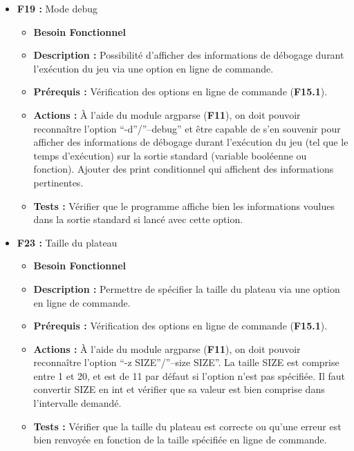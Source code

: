 \documentclass{article}
\begin{document}
\begin{itemize}
\begin{itemize}
        \item \textbf{Tests :} Vérifier que le programme affiche bien les informations voulues dans la sortie standard si lancé avec cette option.
    \end{itemize}
\bigskip    
    \item \textbf{F19 :} Mode debug
    \begin{itemize}
        \item \textbf{Besoin Fonctionnel}
        \item \textbf{Description :} Possibilité d’afficher des informations de débogage durant l'exécution du jeu via une option en ligne de commande.
        \item \textbf{Prérequis :} Vérification des options en ligne de commande (\textbf{F15.1}).
        \item \textbf{Actions :} À l’aide du module argparse (\textbf{F11}), on doit pouvoir reconnaître l’option “-d”/”--debug” et être capable de s’en souvenir pour afficher des informations de débogage durant l'exécution du jeu (tel que le temps d'exécution) sur la sortie standard (variable booléenne ou fonction). Ajouter des print conditionnel qui affichent des informations pertinentes.
        \item \textbf{Tests :} Vérifier que le programme affiche bien les informations voulues dans la sortie standard si lancé avec cette option.
    \end{itemize}
\bigskip    
    \item \textbf{F23 :} Taille du plateau
    \begin{itemize}
        \item \textbf{Besoin Fonctionnel}
        \item \textbf{Description :} Permettre de spécifier la taille du plateau via une option en ligne de commande.
        \item \textbf{Prérequis :} Vérification des options en ligne de commande (\textbf{F15.1}).
        \item \textbf{Actions :} À l’aide du module argparse (\textbf{F11}), on doit pouvoir reconnaître l’option “-z SIZE”/”--size SIZE”. La taille SIZE est comprise entre 1 et 20, et est de 11 par défaut si l’option n’est pas spécifiée. Il faut convertir SIZE en int et vérifier que sa valeur est bien comprise dans l’intervalle demandé.
        \item \textbf{Tests :} Vérifier que la taille du plateau est correcte ou qu’une erreur est bien renvoyée en fonction de la taille spécifiée en ligne de commande.

\end{itemize}
\end{itemize}
\end{document}

